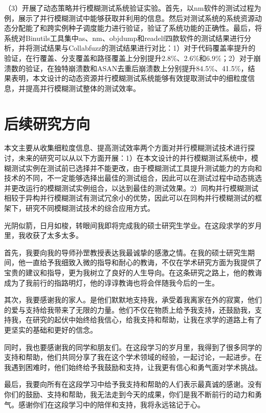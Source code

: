 \documentclass[master]{thesis-uestc}
\begin{document}
（3）开展了动态策略并行模糊测试系统验证实验。首先，以nm软件的测试过程为例，展示了并行模糊测试中能够获取并利用的信息。然后对测试系统的系统资源动态分配能了和跨实例种子调度能力进行验证，验证了系统功能的正确性。最后，将系统对Binutils工具集中as、nm、objdump和readelf四款软件的测试结果进行分析，并将测试结果与Collabfuzz的测试结果进行对比：1）对于代码覆盖率提升的验证，在行覆盖、分支覆盖和路径覆盖上分别提升2.8\%、2.6\%和6.9\%；2）对于崩溃数的验证，在独特崩溃数和ASAN去重后崩溃数上分别提升84.5\%、41.5\%，结果表明，本文设计的动态资源并行模糊测试系统能够有效提取测试中的细粒度信息，并提高并行模糊测试整体的测试效率。

\section{后续研究方向}

本文主要从收集细粒度信息、提高测试效率两个方面对并行模糊测试技术进行探讨，未来的研究可以从以下方面开展：1）在本文设计的并行模糊测试系统中，模糊测试实例在测试前已选择并不能更改，由于模糊测试工具提升测试能力的方向和技术的不同，不一定能够选择出最佳的测试组合，因此可以在测试过程中动态挑选并更改运行的模糊测试实例组合，以达到最佳的测试效果。2）同构并行模糊测试相较于异构并行模糊测试有测试冗余小的优势，因此可以在同构并行模糊测试的框架下，研究不同模糊测试技术的综合应用方式。

\thesisacknowledgement

光阴似箭，日月如梭，转眼间我即将完成我的硕士研究生学业。在这段求学的岁月里，我收获了太多太多。

首先，我要向我的导师孙罡教授表达我最诚挚的感激之情。在我的硕士研究生期间，他一直给予我细致入微的指导和耐心的教诲，不仅在学术研究方面为我提供了宝贵的建议和指导，更为我树立了良好的人生导向。在这条研究之路上，他的教诲成为了我前行的指路明灯，他的谆谆教诲也将会伴随我今后的一生。

其次，我要感谢我的家人。是他们默默地支持我，承受着我离家在外的寂寞，他们的爱与支持给我带来了无限的力量。他们不仅在物质上给予我支持，还鼓励我，支持我，在研究的起伏中始终给我信心，给我支持和帮助，让我在求学的道路上有了更坚实的基础和更好的信念。

同时，我也要感谢我的同学和朋友们。在这段学习的岁月里，我得到了很多同学的支持和帮助，他们共同分享了我在这个学术领域的经验，一起讨论，一起进步。在我遇到困难时，他们始终给予我鼓励和支持，让我更有信心和勇气面对学术挑战。

最后，我要向所有在这段学习中给予我支持和帮助的人们表示最真诚的感谢。没有你们的鼓励、支持和帮助，我无法走到今天的成果，你们是我不断前行的动力和勇气。感谢你们在这段学习中的陪伴和支持，我将永远铭记于心。
\end{document}
